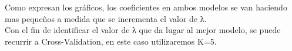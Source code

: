 Como expresan los gráficos, los coeficientes en ambos modelos se van haciendo mas pequeños a medida que se incrementa el valor de λ.\\
Con el fin de identificar el valor de λ que da lugar al mejor modelo, se puede recurrir a Cross-Validation, en este caso utilizaremos K=5.\\



\begin{figure}[H]
\end{figure}


